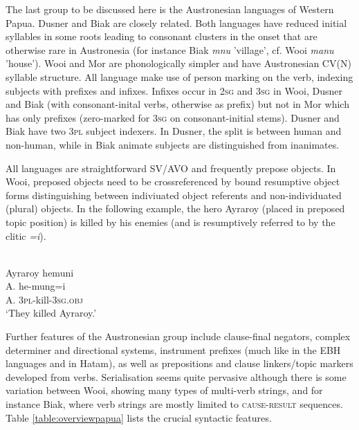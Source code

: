 The last group to be discussed here is the Austronesian languages of Western Papua. Dusner and Biak are closely related. Both languages have reduced initial syllables in some roots leading to consonant clusters in the onset that are otherwise rare in Austronesia (for instance Biak \textit{mnu} 'village', cf. Wooi \textit{manu} 'house'). Wooi and Mor are phonologically simpler and have Austronesian CV(N) syllable structure. All language make use of person marking on the verb, indexing subjects with prefixes and infixes. Infixes occur in \textsc{2sg} and \textsc{3sg} in Wooi, Dusner and Biak (with consonant-inital verbs, otherwise as prefix) but not in Mor which has only prefixes (zero-marked for \textsc{3sg} on consonant-initial stems). Dusner and Biak have two \textsc{3pl} subject indexers. In Dusner, the split is between human and non-human, while in Biak animate subjects are distinguished from inanimates.

All languages are straightforward SV/AVO and frequently prepose objects. In Wooi, preposed objects need to be crossreferenced by bound resumptive object forms distinguishing between indiviuated object referents and non-individuated (plural) objects. In the following example, the hero Ayraroy (placed in preposed topic position) is killed by his enemies (and is resumptively referred to by the clitic \textit{=i}).

\ea 
{}\\
\glll Ayraroy hemuni \\
A. he-mung=i \\
A. \textsc{3}\textsc{pl}-kill-\textsc{3}\textsc{sg}.\textsc{obj} \\
\glft `They killed Ayraroy.'
\z

Further features of the Austronesian group include clause-final negators, complex determiner and directional systems, instrument prefixes (much like in the EBH languages and in Hatam), as well as prepositions and clause linkers/topic markers developed from verbs. Serialisation seems quite pervasive although there is some variation between Wooi, showing many types of multi-verb strings, and for instance Biak, where verb strings are mostly limited to \textsc{cause-result} sequences. Table \ref{table:overviewpapua} lists the crucial syntactic features.

